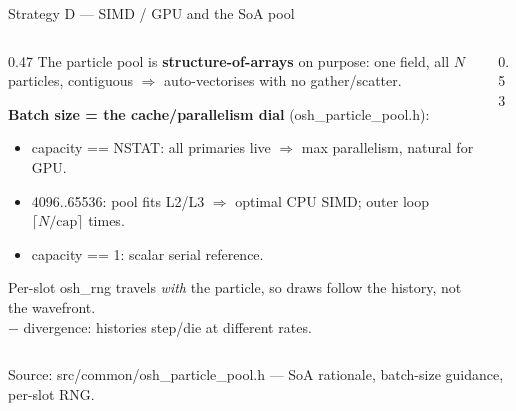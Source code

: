 \documentclass[aspectratio=169,10pt]{beamer}
\newcommand{\code}[1]{{\ttfamily\footnotesize #1}}
\begin{document}
\begin{frame}{Strategy D — SIMD / GPU and the SoA pool}
  \begin{columns}[T]
    \begin{column}{0.47\textwidth}
      \small
      The particle pool is \textbf{structure-of-arrays} on purpose: one field,
      all $N$ particles, contiguous $\Rightarrow$ auto-vectorises with no
      gather/scatter.
      \medskip

      \textbf{Batch size = the cache/parallelism dial} (\code{osh\_particle\_pool.h}):
      \begin{itemize}\scriptsize\itemsep1pt
        \item \code{capacity == NSTAT}: all primaries live $\Rightarrow$ max
              parallelism, natural for GPU.
        \item \code{4096..65536}: pool fits L2/L3 $\Rightarrow$ optimal CPU SIMD;
              outer loop $\lceil N/\text{cap}\rceil$ times.
        \item \code{capacity == 1}: scalar serial reference.
      \end{itemize}
      \medskip
      Per-slot \code{osh\_rng} travels \emph{with} the particle, so draws follow
      the history, not the wavefront.\\
      \textcolor{oshRed}{$-$} divergence: histories step/die at different rates.
    \end{column}
    \begin{column}{0.53\textwidth}
      \centering
    \end{column}
  \end{columns}
  \vspace{0.5mm}
  \footnotesize\color{oshGrey}
  Source: \code{src/common/osh\_particle\_pool.h} — SoA rationale, batch-size guidance, per-slot RNG.
\end{frame}
\end{document}
